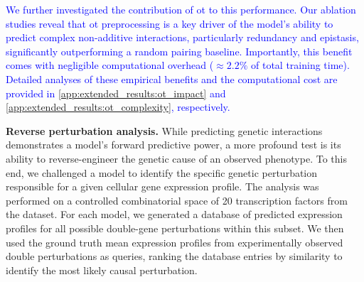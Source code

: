 \documentclass{article}
\begin{document}
\begin{table}[H]
\centering
{}
\caption{Comparison of non-additive genetic interaction prediction. Precision@10 scores for five baseline models across distinct genetic interaction subtypes on the Norman et al. dataset. Higher is better. \textcolor{blue}{Values are mean $\pm$ variance over 3 runs.}}
\label{tab:gi_scores}
\end{table}

\textcolor{blue}{We further investigated the contribution of \gls{ot} to this performance. Our ablation studies reveal that \gls{ot} preprocessing is a key driver of the model's ability to predict complex non-additive interactions, particularly redundancy and epistasis, significantly outperforming a random pairing baseline. Importantly, this benefit comes with negligible computational overhead ($\approx 2.2\%$ of total training time). Detailed analyses of these empirical benefits and the computational cost are provided in \cref{app:extended_results:ot_impact} and \cref{app:extended_results:ot_complexity}, respectively.}

\textbf{Reverse perturbation analysis.} While predicting genetic interactions demonstrates a model's forward predictive power, a more profound test is its ability to reverse-engineer the genetic cause of an observed phenotype.
To this end, we challenged a model to identify the specific genetic perturbation responsible for a given cellular gene expression profile.
The analysis was performed on a controlled combinatorial space of 20 transcription factors from the \citet{norman2019exploring} dataset.
For each model, we generated a database of predicted expression profiles for all possible double-gene perturbations within this subset.
We then used the ground truth mean expression profiles from experimentally observed double perturbations as queries, ranking the database entries by similarity to identify the most likely causal perturbation.
\end{document}
